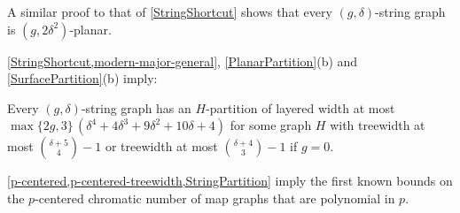 \documentclass{patmorin}
\newcommand{\PP}{\mathcal{P}}
\renewcommand{\le}{\leqslant}
\begin{document}
A similar proof to that of \cref{StringShortcut} shows that every $(g,\delta)$-string graph is $(g,2\delta^2)$-planar. 

%

\cref{StringShortcut,modern-major-general}, \cref{PlanarPartition}(b) and \cref{SurfacePartition}(b) imply:

\begin{thm}
\label{StringPartition}
Every $(g,\delta)$-string graph has an $H$-partition of layered 
width at most $\max\{2g,3\} \,(\delta^4 + 4 \delta^3 + 9 \delta^2 + 10 \delta + 4)$ 
for some graph $H$ with treewidth at most $\binom{ \delta+5}{4}-1$ or treewidth at most $\binom{ \delta+4}{3}-1$ if $g=0$. 
%
%
%
\end{thm}


\cref{p-centered,p-centered-treewidth,StringPartition} imply the first known bounds on the $p$-centered chromatic number of map graphs that are polynomial in $p$.
\end{document}
